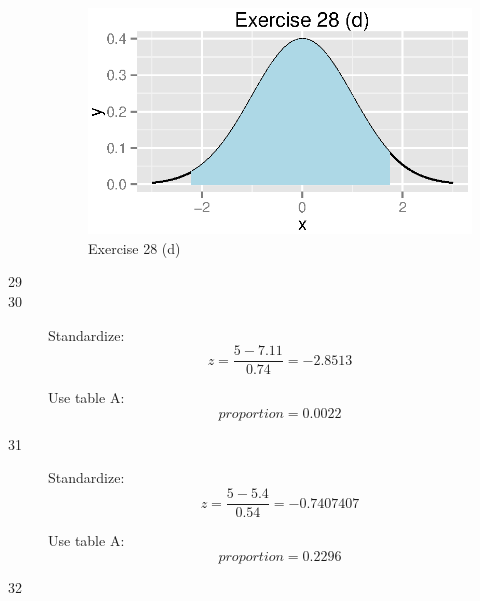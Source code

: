 \documentclass{exam}
\begin{document}
\begin{description}
        \begin{figure}[H]
          \centering
          \includegraphics{figures/ex28d.eps}
          \caption{Exercise 28 (d)}
        \end{figure}

      \item[29]

      \item[30]
        Standardize:
        \[
          z = \frac{5 - 7.11}{0.74} = -2.8513
        \]

        Use table A: 
        \[
          proportion = 0.0022 
        \]

      \item[31]
        Standardize:
        \[
          z = \frac{5 - 5.4}{0.54} = -0.7407407
        \]

        Use table A: 
        \[
          proportion = 0.2296 
        \]

      \item[32]
\end{description}
\end{document}
